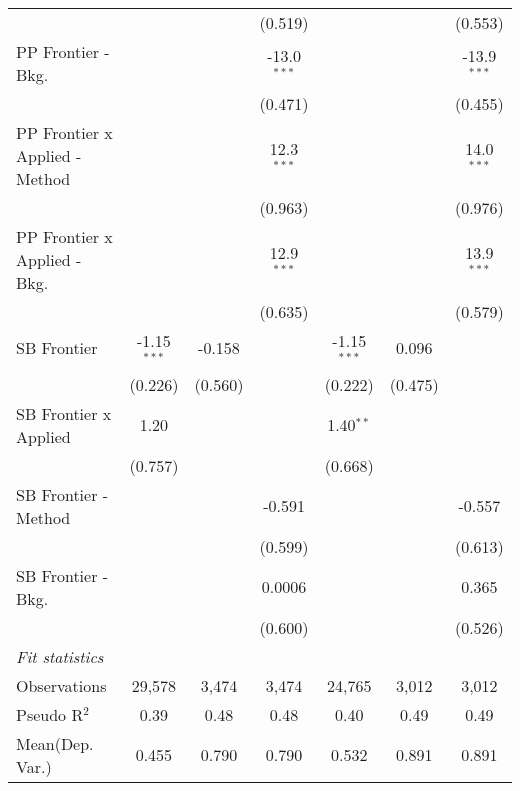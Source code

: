 \begin{tabular}{lcccccc}
                                  &                &                & (0.519)       &                &                & (0.553)\\   
   PP Frontier - Bkg.             &                &                & -13.0$^{***}$ &                &                & -13.9$^{***}$\\   
                                  &                &                & (0.471)       &                &                & (0.455)\\   
   PP Frontier x Applied - Method &                &                & 12.3$^{***}$  &                &                & 14.0$^{***}$\\   
                                  &                &                & (0.963)       &                &                & (0.976)\\   
   PP Frontier x Applied - Bkg.   &                &                & 12.9$^{***}$  &                &                & 13.9$^{***}$\\   
                                  &                &                & (0.635)       &                &                & (0.579)\\   
   SB Frontier                    & -1.15$^{***}$  & -0.158         &               & -1.15$^{***}$  & 0.096          &   \\   
                                  & (0.226)        & (0.560)        &               & (0.222)        & (0.475)        &   \\   
   SB Frontier x Applied          & 1.20           &                &               & 1.40$^{**}$    &                &   \\   
                                  & (0.757)        &                &               & (0.668)        &                &   \\   
   SB Frontier - Method           &                &                & -0.591        &                &                & -0.557\\   
                                  &                &                & (0.599)       &                &                & (0.613)\\   
   SB Frontier - Bkg.             &                &                & 0.0006        &                &                & 0.365\\   
                                  &                &                & (0.600)       &                &                & (0.526)\\   
   \midrule
   \emph{Fit statistics}\\
   Observations                   & 29,578         & 3,474          & 3,474         & 24,765         & 3,012          & 3,012\\  
   Pseudo R$^2$                   & 0.39           & 0.48           & 0.48          & 0.40           & 0.49           & 0.49\\  
Mean(Dep. Var.) & 0.455 & 0.790 & 0.790 & 0.532 & 0.891 & 0.891 \\
   

\end{tabular}
